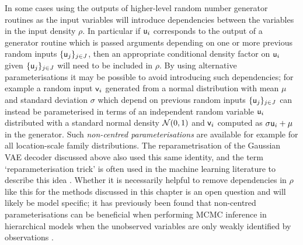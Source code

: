 In some cases using the outputs of higher-level random number generator routines as the input variables will introduce dependencies between the variables in the input density $\rho$. In particular if $\mathsf{u}_i$ corresponds to the output of a generator routine which is passed arguments depending on one or more previous random inputs $\lbrace \mathsf{u}_j\rbrace_{j\in\mathit{J}}$, then an appropriate conditional density factor on $\mathsf{u}_i$ given $\lbrace \mathsf{u}_j\rbrace_{j\in\mathit{J}}$ will need to be included in $\rho$. By using alternative parameterisations it may be possible to avoid introducing such dependencies; for example a random input $\mathsf{v}_i$ generated from a normal distribution with mean $\mu$ and standard deviation $\sigma$ which depend on previous random inputs $\lbrace \mathsf{u}_j\rbrace_{j\in\mathit{J}}$ can instead be parameterised in terms of an independent random variable $\mathsf{u}_i$ distributed with a standard normal density $\nrm{0,1}$ and $\mathsf{v}_i$ computed as $\sigma \mathsf{u}_i + \mu$ in the generator. Such \emph{non-centred parameterisations} \citep{price1958useful,bonnet1964transformations,papaspiliopoulos2007general} are available for example for all location-scale family distributions. The reparametrisation of the Gaussian \ac{VAE} decoder discussed above also used this same identity, and the term `reparameterisation trick' is often used in the machine learning literature to describe this idea \citep{kingma2013auto}. Whether it is necessarily helpful to remove dependencies in $\rho$ like this for the methods discussed in this chapter is an open question and will likely be model specific; it has previously been found that non-centred parameterisations can be beneficial when performing \ac{MCMC} inference in hierarchical models when the unobserved variables are only weakly identified by observations \citep{papaspiliopoulos2003non,papaspiliopoulos2007general,betancourt2015hamiltonian}.  %




